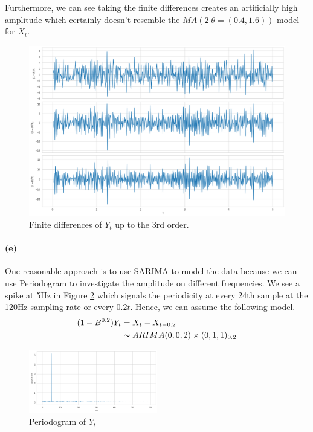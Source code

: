 \documentclass[11pt, letterpaper]{article}
\begin{document}
Furthermore, we can see taking the finite differences creates an artificially high amplitude which certainly doesn't resemble the $MA(2|\theta=(0.4, 1.6))$ model for $X_t$.
\begin{figure}[!h]
  \centering
  \includegraphics[width=1.0\textwidth]{plot3.png}
  \captionsetup{justification=centering}
  \caption{Finite differences of $Y_t$ up to the 3rd order.}
  \label{fig:truth_plus_noise}
\end{figure}

\paragraph{(e)}
One reasonable approach is to use SARIMA to model the data because we can use Periodogram to investigate the amplitude on different frequencies. We see a spike at 5Hz in Figure \ref{fig:periodogram} which signals the periodicity at every 24th sample at the 120Hz sampling rate or every $0.2t$. Hence, we can assume the following model.
\begin{align*}
    (1 - B^{0.2})Y_t &= X_t - X_{t-0.2} \\
        &\thicksim ARIMA(0,0,2) \times (0,1,1)_{0.2}
\end{align*}
\begin{figure}[!h]
  \centering
  \includegraphics[width=0.5\textwidth]{plot4.png}
  \captionsetup{justification=centering}
  \caption{Periodogram of $Y_t$}
  \label{fig:periodogram}
\end{figure}
\end{document}
